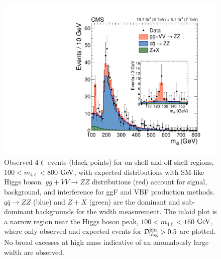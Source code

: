 \begin{figure}[htbp]
\begin{center}
\includegraphics[width=.8\linewidth]{HiggsProperties/figures/fig2_new.pdf}
\caption[$m_{4\ell}$ Distributions of Expected and Observed $4\ell$ Events in the On-Shell and Off-Shell Regions]{Observed $4\ell$ events (black points) for on-shell and off-shell regions, $100<m_{4\ell}<800$ $\rm{GeV}$, with expected distributions with SM-like Higgs boson. $gg + VV \rightarrow ZZ$ distributions (red) account for signal, background, and interference for ggF and VBF production methods. $q\bar{q}\rightarrow ZZ$ (blue) and $Z+X$ (green) are the dominant and sub-dominant backgrounds for the width measurement. The inlaid plot is a narrow region near the Higgs boson peak, $100<m_{4\ell}<160$ $\rm{GeV}$, where only observed and expected events for $\mathcal{D}_{\rm{bkg}}^{\rm{kin}}>0.5$ are plotted. No broad excesses at high mass indicative of an anomalously large width are observed.}
\label{fig:Width4l_Full}
\end{center}
\end{figure}

